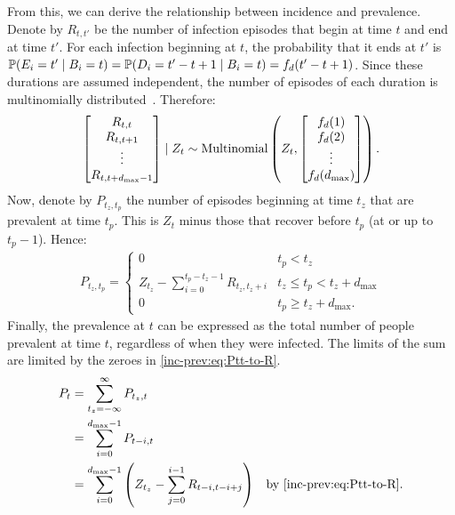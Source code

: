 \documentclass[thesis.tex]{subfiles}
\begin{document}
From this, we can derive the relationship between incidence and prevalence.
Denote by $R_{t,t'}$ be the number of infection episodes that begin at time $t$ and end at time $t'$.
For each infection beginning at $t$, the probability that it ends at $t'$ is $\operatorname{\mathbb{P}}(E_i = t' \mid B_i = t) = \operatorname{\mathbb{P}}(D_i = t' - t + 1 \mid B_i = t) = f_d(t' - t + 1)$.
Since these durations are assumed independent, the number of episodes of each duration is multinomially distributed~\autocite{paganoHIV}.
Therefore:
\begin{align}
\begin{bmatrix}
  R_{t,t} \\ R_{t,t+1} \\ \vdots \\ R_{t,t+d_\text{max}-1}
\end{bmatrix} \mid Z_t
\sim \operatorname{Multinomial} \left(
  Z_t, 
  \begin{bmatrix}
    f_d(1) \\ f_d(2) \\ \vdots \\ f_d(d_\text{max})
  \end{bmatrix}
\right).
\end{align}
Now, denote by $P_{t_z,t_p}$ the number of episodes beginning at time $t_z$ that are prevalent at time $t_p$.
This is $Z_t$ minus those that recover before $t_p$ (\ie at or up to $t_p - 1$).
Hence:
\begin{align}
    P_{t_z,t_p} = \begin{cases}
      0 &t_p < t_z\\
      Z_{t_z} - \sum_{i=0}^{t_p-t_z-1} R_{t_z,t_z+i} &t_z \leq t_p < t_z + d_\text{max}\\
      0 &t_p \geq t_z + d_\text{max}.
  \end{cases} \label{inc-prev:eq:Ptt-to-R}
\end{align}
Finally, the prevalence at $t$ can be expressed as the total number of people prevalent at time $t$, regardless of when they were infected.
The limits of the sum are limited by the zeroes in \cref{inc-prev:eq:Ptt-to-R}.
\begin{align}
  P_t
  &= \sum_{t_z=-\infty}^\infty P_{t_z,t} \\
  &= \sum_{i=0}^{\dmax-1} P_{t-i,t} \label{inc-prev:eq:Pt-to-Ptt} \\
  &= \sum_{i=0}^{\dmax-1} \left(Z_{t_z} - \sum_{j=0}^{i-1} R_{t-i,t-i+j} \right) &\text{by \cref{inc-prev:eq:Ptt-to-R}}\label{inc-prev:eq:Pt-to-Rtt}.
\end{align}
\end{document}

